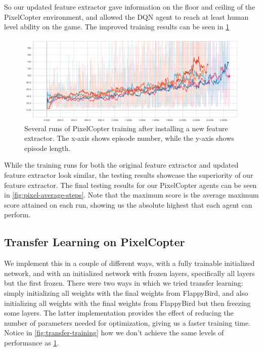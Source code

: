 \documentclass{article}
\begin{document}
So our updated feature extractor gave information on the floor and ceiling of the PixelCopter environment, and allowed the DQN agent to reach at least human level ability on the game. The improved training results can be seen in \ref{fig:pixelcopter-new-features}

\begin{figure}[h!]
\includegraphics[width=\textwidth]{pixelcopter-new-features}
\caption{Several runs of PixelCopter training after installing a new feature extractor. The x-axis shows episode number, while the y-axis shows episode length.}
\label{fig:pixelcopter-new-features}
\end{figure}

While the training runs for both the original feature extractor and updated feature extractor look similar, the testing results showcase the superiority of our feature extractor.
The final testing results for our PixelCopter agents can be seen in \ref{fig:pixel-average-steps}.
Note that the maximum score is the average maximum score attained on each run, showing us the absolute highest that each agent can perform. 

\subsection{Transfer Learning on PixelCopter}
We implement this in a couple of different ways, with a fully trainable initialized network, and with an initialized network with frozen layers, specifically all layers but the first frozen.
There were two ways in which we tried transfer learning: simply initializing all weights with the final weights from FlappyBird, and also initializing all weights with the final weights from FlappyBird but then freezing some layers.
The latter implementation provides the effect of reducing the number of parameters needed for optimization, giving us a faster training time.
Notice in \ref{fig:transfer-training} how we don't achieve the same levels of performance as \ref{fig:pixelcopter-new-features}.
\end{document}
